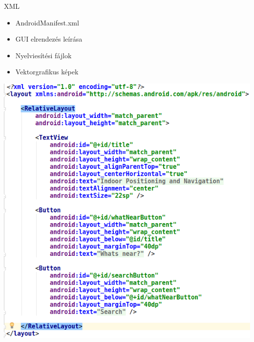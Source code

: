 \documentclass{beamer}
\begin{document}
\begin{frame}[fragile]{XML}
	\begin{minipage}{0.40\textwidth}
		\begin{itemize}
			\item AndroidManifest.xml
			\item GUI elrendezés leírása
			\item Nyelviesítési fájlok
			\item Vektorgrafikus képek
		\end{itemize}
	\end{minipage}
\begin{minipage}{.59\textheight}
	\centering
	\includegraphics[width=1\linewidth]{figures/layout.png}
\end{minipage}
\end{frame}
\end{document}
